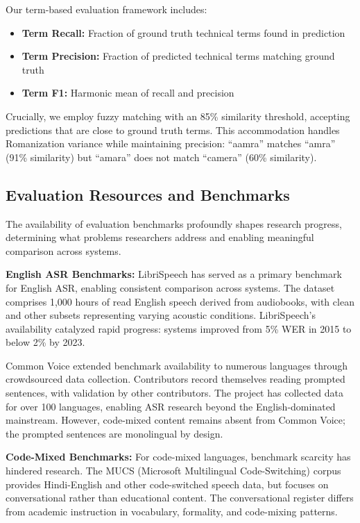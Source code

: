 Our term-based evaluation framework includes:
\begin{itemize}
    \item \textbf{Term Recall:} Fraction of ground truth technical terms found in prediction
    \item \textbf{Term Precision:} Fraction of predicted technical terms matching ground truth
    \item \textbf{Term F1:} Harmonic mean of recall and precision
\end{itemize}

Crucially, we employ fuzzy matching with an 85\% similarity threshold, accepting predictions that are close to ground truth terms. This accommodation handles Romanization variance while maintaining precision: ``aamra'' matches ``amra'' (91\% similarity) but ``amara'' does not match ``camera'' (60\% similarity).

\subsection{Evaluation Resources and Benchmarks}

The availability of evaluation benchmarks profoundly shapes research progress, determining what problems researchers address and enabling meaningful comparison across systems.

\textbf{English ASR Benchmarks:} LibriSpeech \cite{Panayotov2015} has served as a primary benchmark for English ASR, enabling consistent comparison across systems. The dataset comprises 1,000 hours of read English speech derived from audiobooks, with clean and other subsets representing varying acoustic conditions. LibriSpeech's availability catalyzed rapid progress: systems improved from 5\% WER in 2015 to below 2\% by 2023.

Common Voice \cite{Ardila2020} extended benchmark availability to numerous languages through crowdsourced data collection. Contributors record themselves reading prompted sentences, with validation by other contributors. The project has collected data for over 100 languages, enabling ASR research beyond the English-dominated mainstream. However, code-mixed content remains absent from Common Voice; the prompted sentences are monolingual by design.

\textbf{Code-Mixed Benchmarks:} For code-mixed languages, benchmark scarcity has hindered research. The MUCS (Microsoft Multilingual Code-Switching) corpus \cite{Diwan2021} provides Hindi-English and other code-switched speech data, but focuses on conversational rather than educational content. The conversational register differs from academic instruction in vocabulary, formality, and code-mixing patterns.

